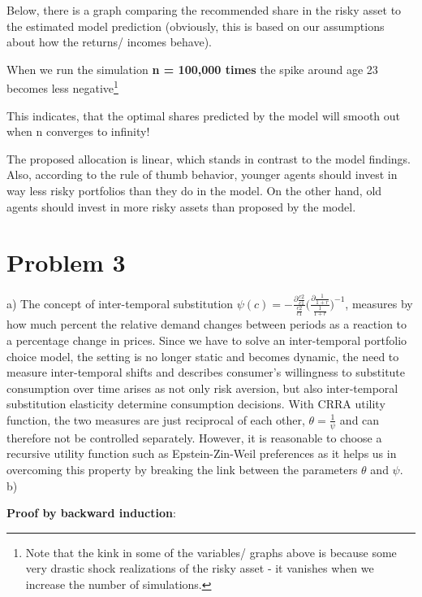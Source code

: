 \documentclass[12pt,a4paper]{article}
\begin{document}
Below, there is a graph comparing the recommended share in the risky asset to the estimated model prediction (obviously, this is based on our assumptions about how the returns/ incomes behave).

When we run the simulation \textbf{n = 100,000 times} the spike around age 23 becomes less negative\footnote{Note that the kink in some of the variables/ graphs above is because some very drastic shock realizations of the risky asset - it vanishes when we increase the number of simulations.}

This indicates, that the optimal shares predicted by the model will smooth out when n converges to infinity!

The proposed allocation is linear, which stands in contrast to the model findings. Also, according to the rule of thumb behavior, younger agents should invest in way less risky portfolios than they do in the model. On the other hand, old agents should invest in more risky assets than proposed by the model.

\section*{Problem 3}

a) The concept of inter-temporal substitution $\psi(c)=-\frac{\partial\frac{c2}{c1}}{\frac{c2}{c1}}\bigg(\frac{\partial\frac{1}{1+r}}{\frac{1}{1+r}}\bigg)^{-1}$, measures by how much percent the relative demand changes between periods as a reaction to a percentage change in prices. Since we have to solve an inter-temporal portfolio choice model, the setting is no longer static and becomes dynamic, the need to measure inter-temporal shifts and describes consumer's willingness to substitute consumption over time arises as not only risk aversion, but also inter-temporal substitution elasticity determine consumption decisions. With CRRA utility function, the two measures are just reciprocal of each other, $\theta=\frac{1}{\psi}$ and can therefore not be controlled separately. However, it is reasonable to choose a recursive utility function such as Epstein-Zin-Weil preferences as it helps us in overcoming this property by breaking the link between the parameters $\theta$ and $\psi$.    \\

b)

\textbf{Proof by backward induction}:
\end{document}
